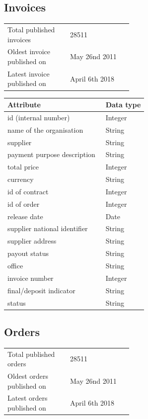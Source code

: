 \documentclass[thesis=B,english]{sprlajur-slovakopendata}[2018/05/12]
\begin{document}
\subsection{Invoices}
\begin{tabular}{  p{0.5\linewidth}  l }
	\\
	Total published invoices    & 28511          \\
	Oldest invoice published on & May 26nd 2011  \\
	Latest invoice published on & April 6th 2018 \\
\end{tabular}
        
\begin{center}
	\begin{tabular}{  p{0.7\linewidth} | p{0.3\linewidth} }
		Attribute                    & Data type \\ \hline
		id (internal number)         & Integer   \\
		name of the organisation     & String    \\
		supplier                     & String    \\
		payment purpose description  & String    \\
		total price                  & Integer   \\
		currency                     & String    \\
		id of contract               & Integer   \\
		id of order                  & Integer   \\
		release date                 & Date      \\
		supplier national identifier & String    \\
		supplier address             & String    \\
		payout status                & String    \\
		office                       & String    \\
		invoice number               & Integer   \\
		final/deposit indicator      & String    \\
		status                       & String    \\
	\end{tabular}
\end{center}
\newpage
\subsection{Orders}
\begin{tabular}{  p{0.5\linewidth}  l }
	\\
	Total published orders     & 28511          \\
	Oldest orders published on & May 26nd 2011  \\
	Latest orders published on & April 6th 2018 \\
\end{tabular}
        
\end{document}
